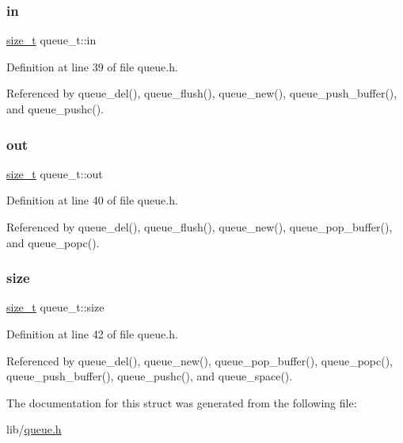 \mbox{\label{structqueue__t_a7a6832e36c70a1db7fddc93fb6be9d63}} 
\subsubsection{\texorpdfstring{in}{in}}
{\footnotesize\ttfamily \hyperlink{hardware_2user__config_8h_aea0c7eab1ce1eebb4e879ef4e23c16ee}{size\+\_\+t} queue\+\_\+t\+::in}



Definition at line 39 of file queue.\+h.



Referenced by queue\+\_\+del(), queue\+\_\+flush(), queue\+\_\+new(), queue\+\_\+push\+\_\+buffer(), and queue\+\_\+pushc().

\mbox{\label{structqueue__t_a8f6e1c623d2ceed398a71a0aab93b0fa}} 
\subsubsection{\texorpdfstring{out}{out}}
{\footnotesize\ttfamily \hyperlink{hardware_2user__config_8h_aea0c7eab1ce1eebb4e879ef4e23c16ee}{size\+\_\+t} queue\+\_\+t\+::out}



Definition at line 40 of file queue.\+h.



Referenced by queue\+\_\+del(), queue\+\_\+flush(), queue\+\_\+new(), queue\+\_\+pop\+\_\+buffer(), and queue\+\_\+popc().

\mbox{\label{structqueue__t_a83a13b888f9d4ef127d706559818b779}} 
\subsubsection{\texorpdfstring{size}{size}}
{\footnotesize\ttfamily \hyperlink{hardware_2user__config_8h_aea0c7eab1ce1eebb4e879ef4e23c16ee}{size\+\_\+t} queue\+\_\+t\+::size}



Definition at line 42 of file queue.\+h.



Referenced by queue\+\_\+del(), queue\+\_\+new(), queue\+\_\+pop\+\_\+buffer(), queue\+\_\+popc(), queue\+\_\+push\+\_\+buffer(), queue\+\_\+pushc(), and queue\+\_\+space().



The documentation for this struct was generated from the following file\+:\begin{DoxyCompactItemize}
\item 
lib/\hyperlink{queue_8h}{queue.\+h}\end{DoxyCompactItemize}
